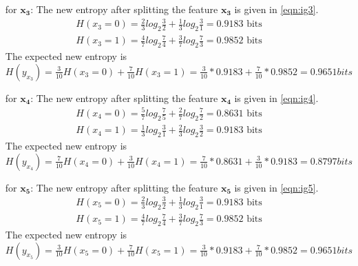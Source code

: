 \documentclass[a4paper, 11pt]{article}
\begin{document}
\begin{enumerate}[(a)]
\begin{enumerate}
\item[for $\mathbf{x_3}$:] The new entropy after splitting the feature $\mathbf{x_3}$ is given in \autoref{eqn:ig3}.
\begin{equation}
\begin{split}
H(x_3 = 0) = \frac{2}{3}log_2 \frac{3}{2} + \frac{1}{3}log_2 \frac{3}{1} = 0.9183\text{ bits }\\
H(x_3 = 1) = \frac{4}{7}log_2 \frac{7}{4} + \frac{3}{7}log_2 \frac{7}{3} = 0.9852\text{ bits }
\end{split}
\label{eqn:ig3}
\end{equation}
The expected new entropy is $H(y_{x_3}) = \frac{3}{10} H(x_3 = 0) + \frac{7}{10} H(x_3 = 1) = \frac{3}{10} * 0.9183 + \frac{7}{10} * 0.9852 = 0.9651 bits $

\item[for $\mathbf{x_4}$:] The new entropy after splitting the feature $\mathbf{x_4}$ is given in \autoref{eqn:ig4}.
\begin{equation}
\begin{split}
H(x_4 = 0) = \frac{5}{7}log_2 \frac{7}{5} + \frac{2}{7}log_2 \frac{7}{2} = 0.8631\text{ bits }\\
H(x_4 = 1) = \frac{1}{3}log_2 \frac{3}{1} + \frac{2}{3}log_2 \frac{3}{2}  = 0.9183\text{ bits }
\end{split}
\label{eqn:ig4}
\end{equation}
The expected new entropy is $H(y_{x_4}) = \frac{7}{10} H(x_4 = 0) + \frac{3}{10} H(x_4 = 1) = \frac{7}{10} * 0.8631 + \frac{3}{10} * 0.9183 = 0.8797 bits $

\item[for $\mathbf{x_5}$:] The new entropy after splitting the feature $\mathbf{x_5}$ is given in \autoref{eqn:ig5}.
\begin{equation}
\begin{split}
H(x_5 = 0) = \frac{2}{3}log_2 \frac{3}{2} + \frac{1}{3}log_2 \frac{3}{1} = 0.9183\text{ bits }\\
H(x_5 = 1) = \frac{4}{7}log_2 \frac{7}{4} + \frac{3}{7}log_2 \frac{7}{3} = 0.9852\text{ bits }
\end{split}
\label{eqn:ig5}
\end{equation}
The expected new entropy is $H(y_{x_5}) = \frac{3}{10} H(x_5 = 0) + \frac{7}{10} H(x_5 = 1) = \frac{3}{10} * 0.9183 + \frac{7}{10} * 0.9852 = 0.9651 bits $
\end{enumerate}


\end{enumerate}
\end{document}
